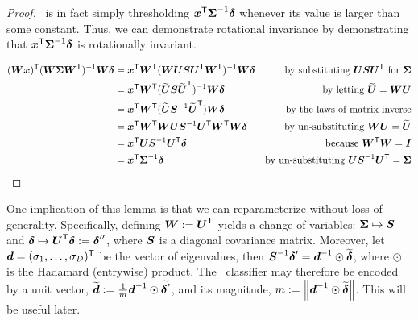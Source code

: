 \documentclass[11pt]{extarticle}
\begin{document}
\begin{proof}
\Lda~is in fact simply thresholding $\boldsymbol{x}^{\mathsf{T}} \boldsymbol{\Sigma}^{-1} \boldsymbol{\delta}$ whenever its value is larger than some constant.
Thus, we can demonstrate rotational invariance by demonstrating that $\boldsymbol{x}^{\mathsf{T}} \boldsymbol{\Sigma}^{-1} \boldsymbol{\delta}$ is rotationally invariant.


\begin{align*}
(\bW \bx) \TT  (\bW \bSig \bW\TT )^{-1} \bW \bdel  %
&= \bx\TT \bW\TT  (\bW \bU \bS \bU\TT \bW\TT)^{-1} \bW \bdel & \text{by substituting $\bU \bS \bU\TT$ for $\bSig$} \\
&= \bx\TT \bW\TT  (\mt{\bU} \bS \mt{\bU}\TT)^{-1} \bW \bdel & \text{by letting $\mt{\bU}=\bW \bU$} \\
&= \bx\TT \bW\TT  (\mt{\bU} \bS^{-1} \mt{\bU}\TT) \bW \bdel & \text{by the laws of matrix inverse} \\
&= \bx\TT \bW\TT  \bW \bU \bS^{-1}  \bU\TT \bW\TT \bW \bdel & \text{by un-substituting $\bW \bU=\mt{\bU}$} \\
&= \bx\TT  \bU \bS^{-1}  \bU\TT  \bdel  & \text{because $\bW\TT \bW = \bI$} \\
&= \bx\TT   \bSig^{-1} \bdel & \text{by un-substituting $\bU \bS^{-1} \bU\TT = \bSig$}
\end{align*}
\end{proof}

One implication of this lemma is that we can reparameterize without loss of generality.  Specifically, defining $\boldsymbol{W} := \boldsymbol{U}^{\mathsf{T}}$ yields a change of variables: $\boldsymbol{\Sigma} \mapsto \boldsymbol{S}$ and $\boldsymbol{\delta} \mapsto \boldsymbol{U}^{\mathsf{T}} \boldsymbol{\delta} := \boldsymbol{\delta}''$, where $\boldsymbol{S}$ is a diagonal covariance matrix.  Moreover, let $\boldsymbol{d}=(\sigma_1,\ldots, \sigma_D)^{\mathsf{T}}$ be the vector of eigenvalues, then
$\boldsymbol{S}^{-1} {\boldsymbol{\delta}'}=\boldsymbol{d}^{-1} \odot \widetilde{\boldsymbol{\delta}}$, where $\odot$ is the Hadamard (entrywise) product.  The \Lda~classifier may therefore be encoded by a unit vector, $\widetilde{\boldsymbol{d}}:= \frac{1}{m} \boldsymbol{d}^{-1} \odot \widetilde{\boldsymbol{\delta}'}$, and its magnitude, $m:=\left \lVert\boldsymbol{d}^{-1} \odot \widetilde{\boldsymbol{\delta}} \right \rVert$.
This will be useful later.
\end{document}
